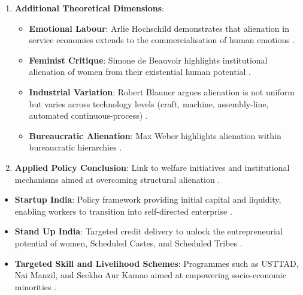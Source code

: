 \begin{enumerate}
\begin{itemize}
        \item In the post-industrial service economy, white-collar workers suffer distinct psychological alienation .
    \end{itemize}
    \item \textbf{Additional Theoretical Dimensions}:
    \begin{itemize}
        \item \textbf{Emotional Labour}: Arlie Hochschild demonstrates that alienation in service economies extends to the commercialisation of human emotions .
        \item \textbf{Feminist Critique}: Simone de Beauvoir highlights institutional alienation of women from their existential human potential .
        \item \textbf{Industrial Variation}: Robert Blauner argues alienation is not uniform but varies across technology levels (craft, machine, assembly-line, automated continuous-process) .
        \item \textbf{Bureaucratic Alienation}: Max Weber highlights alienation within bureaucratic hierarchies .
    \end{itemize}
    \item \textbf{Applied Policy Conclusion}: Link to welfare initiatives and institutional mechanisms aimed at overcoming structural alienation .
\end{enumerate}

\begin{GovtPolicy}
\begin{itemize}
    \item \textbf{Startup India}: Policy framework providing initial capital and liquidity, enabling workers to transition into self-directed enterprise .
    \item \textbf{Stand Up India}: Targeted credit delivery to unlock the entrepreneurial potential of women, Scheduled Castes, and Scheduled Tribes .
    \item \textbf{Targeted Skill and Livelihood Schemes}: Programmes such as USTTAD, Nai Manzil, and Seekho Aur Kamao aimed at empowering socio-economic minorities .
\end{itemize}
\end{GovtPolicy}


